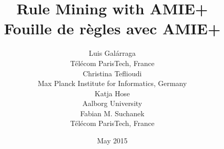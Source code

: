 \documentclass[twocolumn]{article}          %
\begin{document}
\title{Rule Mining with AMIE+\\[0.5cm]
Fouille de règles avec AMIE+\\[0.5cm]}
\author{
Luis Gal\'arraga\\
T\'el\'ecom ParisTech, France\\[0.4cm]
Christina Teflioudi\\
Max Planck Institute for Informatics, Germany\\[0.4cm]
Katja Hose\\
Aalborg University\\[0.4cm]
Fabian M. Suchanek\\
T\'el\'ecom ParisTech, France
}
\date{May 2015}
\maketitle
\newpage
\onecolumn
\end{document}
